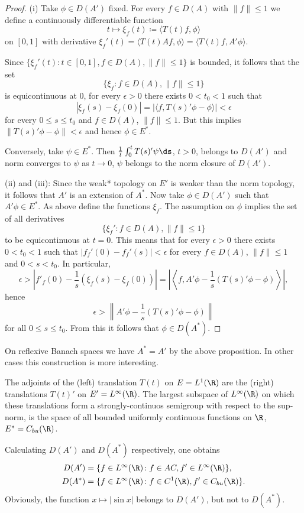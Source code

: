 \begin{proof}
(i) Take $\phi \in D(A')$ fixed.
For every $f \in D(A)$ with $\|f\| \leq 1$ we define a continuously differentiable function
\[
    t \mapsto \xi_{f}(t) \coloneqq \langle T(t)f,\phi \rangle
\]
on $\left[ 0,1 \right]$ with derivative $\xi_{f}'(t) = \langle T(t)Af,\phi \rangle = \langle T(t)f,A'\phi \rangle$.

Since $\{\xi_{f}'(t) \colon t \in \left[ 0,1 \right], f \in D(A), \|f\| \leq 1\}$ is bounded, it follows that the set
\[
    \{\xi_{f} \colon f \in D(A), \|f\| \leq 1\}
\]
is equicontinuous at $0$, \ie for every $\epsilon > 0$ there exists $0 < t_{0} < 1$ such that
\[
    |\xi_{f}(s) - \xi_{f}(0)| = |\langle f,T(s)'\phi - \phi \rangle| < \epsilon
\]
for every $0 \leq s \leq t_{0}$ and $f \in D(A)$, $\|f\| \leq 1$.
But this implies $\|T(s)'\phi - \phi\| < \epsilon$ and hence $\phi \in E^{*}$.

Conversely, take $\psi \in E^{*}$.
Then $\frac{1}{t}\int_{0}^{t} T(s)'\psi \ds$, $t > 0$, belongs to $D(A')$ and norm converges to $\psi$ as $t \to 0$, \ie $\psi$ belongs to the norm closure of\/ $D(A')$.

(ii) and (iii): Since the weak* topology on $E'$ is weaker than the norm topology, it follows that $A'$ is an extension of\/ $A^{*}$.
Now take $\phi \in D(A')$ such that $A'\phi \in E^{*}$.
As above define the functions $\xi_{f}$. 
The assumption on $\phi$ implies the set of all derivatives
\[
\{\xi_{f}' \colon f \in D(A), \|f\| \leq 1\}
\]
to be equicontinuous at $t = 0$. 
This means that for every $\epsilon > 0$ there exists $0 < t_{0} < 1$ such that $|f_f'(0) - f_f'(s)| < \epsilon$ for every $f \in D(A)$, $\|f\| \leq 1$ and $0 < s < t_{0}$.
In particular,
\[
    \epsilon > \left\lvert f'_f(0) - \frac{1}{s}(\xi_f(s)-\xi_f(0)) \right\rvert 
    = \left\lvert \left\langle f,A'\phi - \frac{1}{s}(T(s)'\phi-\phi) \right\rangle \right\rvert ,
\]
hence
\[
    \epsilon > \left\|A'\phi - \frac{1}{s}(T(s)'\phi-\phi) \right\|
\]
for all $0 \leq s \leq t_{0}$.
From this it follows that $\phi \in D(A^*)$.
\end{proof}
On reflexive Banach spaces we have $A^* = A'$ by the above proposition.
In other cases this construction is more interesting.
\begin{example*}[continued]\label{ex:a1-3.4}
The adjoints of the (left) translation $T(t)$ on $E = L^1(\R)$ are the (right) translations $T(t)'$ on $E' = L^\infty(\R)$.
The largest subspace of\/ $L^\infty(\R)$ on which these translations form a strongly-continuos semigroup with respect to the sup-norm, is the space of all bounded uniformly continuous functions on $\R$, \ie $E^* = C_{bu}(\R)$.

Calculating $D(A')$ and $D(A^*)$ respectively, one obtains
\begin{align*}
    D(A') &= \{f \in L^\infty(\R) \colon f \in AC, f' \in L^\infty(\R)\}, \\
    D(A^*) &= \{f \in L^\infty(\R) \colon f \in C^1(\R), f' \in C_{bu}(\R)\}.
\end{align*}
Obviously, the function $x \mapsto |\sin x|$ belongs to $D(A')$, but not to $D(A^*)$.
\end{example*}
